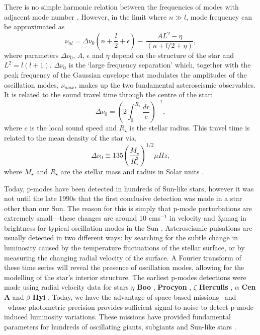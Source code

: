 There is no simple harmonic relation between the frequencies of modes with
adjacent mode number \citep{brown}.
However, in the limit where $n \gg l$, mode frequency can be approximated as
\begin{equation}
    \nu_{nl} = \Delta\nu_0\left(n + \frac{l}{2} + \epsilon \right) - \
    \frac{AL^2 - \eta}{(n + l/2 + \eta)},
\end{equation}
where parameters $\Delta\nu_0$, $A$, $\epsilon$ and $\eta$ depend on the
structure of the star and $L^2 = l(l+1)$.
$\Delta\nu_0$ is the `large frequency separation' which, together with the
peak frequency of the Gaussian envelope that modulates the amplitudes of the
oscillation modes, $\nu_{max}$, makes up the two fundamental asteroseismic
observables.
It is related to the sound travel time through the centre of the star:
\begin{equation}
\Delta\nu_0 = \left(2\int_0^{R_\star}\frac{dr}{c}\right)^{-1},
\end{equation}
where $c$ is the local sound speed and $R_\star$ is the stellar radius.
This travel time is related to the mean density of the star via,
\begin{equation}
\Delta\nu_0 \cong 135\left(\frac{M_\star}{R_\star^3}\right)^{1/2}\mu Hz,
\end{equation}
where $M_\star$ and $R_\star$ are the stellar mass and radius in Solar units
\citep{cox, brown}.

Today, p-modes have been detected in hundreds of Sun-like stars, however it
was not until the late 1990s that the first conclusive detection was made in
a star other than our Sun.
The reason for this is simply that p-mode perturbations are extremely
small---these changes are around 10 cms$^{-1}$ in velocity and 3$\mu$mag in
brightness for typical oscillation modes in the Sun \citep{brown2000}.
Asteroseismic pulsations are usually detected in two different ways: by
searching for the subtle change in luminosity caused by the temperature
fluctuations of the stellar surface, or by measuring the changing radial
velocity of the surface.
A Fourier transform of these time series will reveal the presence of
oscillation modes, allowing for the modelling of the star's interior
structure.
The earliest p-modes detections were made using radial velocity data
\citep{kjeldsen2001} for stars $\eta$ {\bf Boo} \citep{kjeldsen1995}, {\bf
Procyon} \citep{barban1999, martic1999}, $\zeta$ {\bf Herculis}
\citep{martic2001}, $\alpha$ {\bf Cen A} \citep{kjeldsen1999} and $\beta$ {\bf
Hyi} \citep{bedding2001}.
Today, we have the advantage of space-based missions \kepler\ and \corot\
whose photometric precision provides sufficient signal-to-noise to detect
p-mode-induced luminosity variations.
These missions have provided fundamental parameters for hundreds of
oscillating giants, subgiants and Sun-like stars \citep[e.g.][]{michel2008,
bruntt2009, chaplin2014}.

